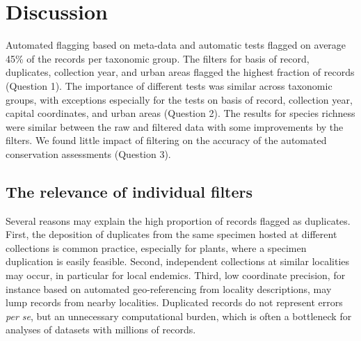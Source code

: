 \documentclass[fleqn,10pt,lineno]{wlpeerj} %
\begin{document}
\hypertarget{discussion}{%
\section*{Discussion}\label{discussion}}

Automated flagging based on meta-data and automatic tests flagged on average 45\% of the records per taxonomic group. The filters for basis of record, duplicates, collection year, and urban areas flagged the highest fraction of records (Question 1). The importance of different tests was similar across taxonomic groups, with exceptions especially for the tests on basis of record, collection year, capital coordinates, and urban areas (Question 2). The results for species richness were similar between the raw and filtered data with some improvements by the filters. We found little impact of filtering on the accuracy of the automated conservation assessments (Question 3).

\hypertarget{the-relevance-of-individual-filters}{%
\subsection*{The relevance of individual filters}\label{the-relevance-of-individual-filters}}

Several reasons may explain the high proportion of records flagged as duplicates. First, the deposition of duplicates from the same specimen hosted at different collections is common practice, especially for plants, where a specimen duplication is easily feasible. Second, independent collections at similar localities may occur, in particular for local endemics. Third, low coordinate precision, for instance based on automated geo-referencing from locality descriptions, may lump records from nearby localities. Duplicated records do not represent errors \emph{per se}, but an unnecessary computational burden, which is often a bottleneck for analyses of datasets with millions of records.
\end{document}
